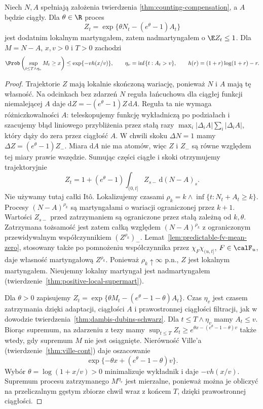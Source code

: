 \begin{twierdzenie}
\label{thm:counting-exponential-bound}
Niech $N,A$ spełniają założenia twierdzenia
\ref{thm:counting-compensation}, a $A$ będzie
ciągły. Dla $\theta\in\R$ proces
\[
Z_t=\exp\{\theta N_t-(e^\theta-1)A_t\}
\]
jest dodatnim lokalnym martyngałem, zatem
nadmartyngałem o $\E Z_t\le1$.
Dla $M=N-A$, $x,v>0$ i $T>0$ zachodzi
\[
\Prob\left(\sup_{t\le T\wedge\eta_v}M_t\ge x\right)
\le \exp\{-v h(x/v)\},
\qquad \eta_v=\inf\{t:A_t>v\},
\qquad h(r)=(1+r)\log(1+r)-r .
\]
\end{twierdzenie}
\begin{proof}
Trajektorie $Z$ mają lokalnie skończoną
wariację, ponieważ $N$ i $A$ mają tę własność.
Na odcinkach bez zdarzeń $N$ reguła łańcuchowa
dla ciągłej funkcji niemalejącej $A$ daje
$\mathrm dZ=-(e^\theta-1)Z\,\mathrm dA$.
Reguła ta nie wymaga różniczkowalności $A$:
teleskopujemy funkcję wykładniczą po
podziałach i szacujemy błąd liniowego
przybliżenia przez stałą razy
$\max_i|\Delta_i A|\sum_i|\Delta_i A|$,
który dąży do zera przez ciągłość $A$.
W chwili skoku $\Delta N=1$ mamy
$\Delta Z=(e^\theta-1)Z_-$.
Miara $\mathrm dA$ nie ma atomów,
więc $Z$ i $Z_-$ są równe względem tej miary
prawie wszędzie. Sumując części ciągłe
i skoki otrzymujemy trajektoryjnie
\[
Z_t=1+(e^\theta-1)\int_{(0,t]}Z_{s-}\,\mathrm d(N-A)_s .
\]
Nie używamy tutaj całki It\^o.
Lokalizujemy czasami
$\rho_k=k\wedge\inf\{t:N_t+A_t\ge k\}$.
Procesy $(N-A)^{\rho_k}$ są martyngałami
o wariacji ograniczonej przez $k+1$.
Wartości $Z_{s-}$ przed zatrzymaniem
są ograniczone przez stałą zależną od $k,\theta$.
Zatrzymana tożsamość jest zatem całką
względem $(N-A)^{\rho_k}$ z ograniczonym
przewidywalnym współczynnikiem
$(Z^{\rho_k})_-$.
Lemat~\ref{lem:predictable-fv-mean-zero},
stosowany także po pomnożeniu współczynnika
przez $\chi_F\chi_{(u,t]}$, $F\in\calF_u$,
daje własność martyngałową $Z^{\rho_k}$.
Ponieważ $\rho_k\uparrow\infty$ p.n.,
$Z$ jest lokalnym martyngałem.
Nieujemny lokalny martyngał jest nadmartyngałem
(twierdzenie~\ref{thm:positive-local-supermart}).

Dla $\theta>0$ zapisujemy
$Z_t=\exp\{\theta M_t-(e^\theta-1-\theta)A_t\}$.
Czas $\eta_v$ jest czasem zatrzymania dzięki
adaptacji, ciągłości $A$ i prawostronnej
ciągłości filtracji, jak w dowodzie
twierdzenia~\ref{thm:dambis-dubins-schwarz}.
Dla $t\le T\wedge\eta_v$ mamy $A_t\le v$.
Biorąc supremum, na zdarzeniu z tezy mamy
$\sup_{t\le T} Z_t\ge
e^{\theta x-(e^\theta-1-\theta)v}$
także wtedy, gdy supremum $M$ nie jest osiągnięte.
Nierówność Ville'a
(twierdzenie~\ref{thm:ville-cont}) daje
oszacowanie
\[
\exp\{-\theta x+(e^\theta-1-\theta)v\}.
\]
Wybór $\theta=\log(1+x/v)>0$ minimalizuje
wykładnik i daje $-vh(x/v)$.
Supremum procesu zatrzymanego $M^{\eta_v}$
jest mierzalne, ponieważ można je obliczyć
na przeliczalnym gęstym zbiorze chwil
wraz z końcem $T$, dzięki prawostronnej
ciągłości.
\end{proof}

